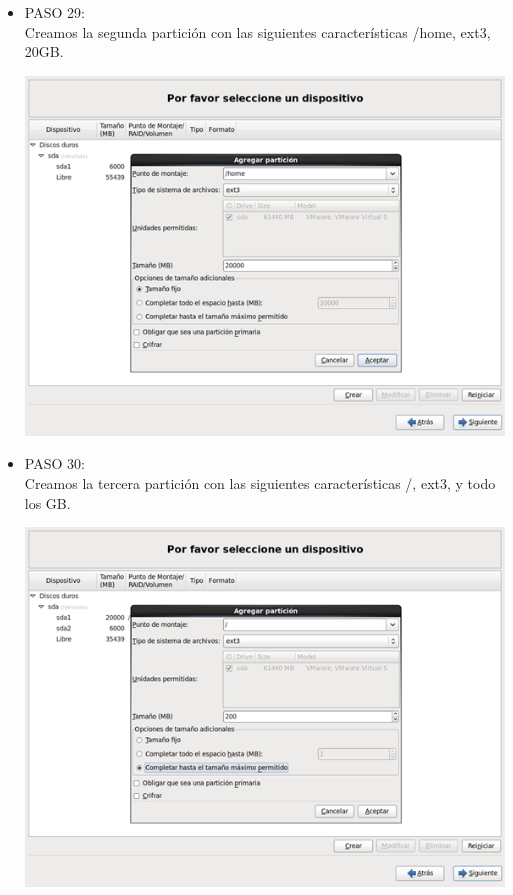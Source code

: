 \begin{itemize}
\item PASO 29:
\\Creamos la segunda partición con las siguientes características /home, ext3, 20GB.
		\begin{center}
		\includegraphics[width=13cm]{./Imagenes/29}
		\end{center}
	
	\end{itemize} 

\begin{itemize}
\item PASO 30:
\\Creamos la tercera partición con las siguientes características /, ext3, y todo los GB.
		\begin{center}
		\includegraphics[width=13cm]{./Imagenes/30}
		\end{center}
	\\\
	\end{itemize} 

